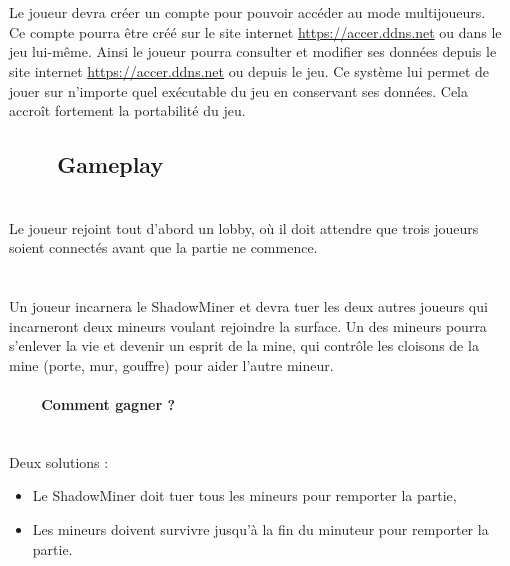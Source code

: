 \documentclass[titlepage, 13px, a4paper]{report}
\begin{document}
\paragraph*{} \hspace{0pt} \\
Le joueur devra créer un compte pour pouvoir accéder au mode multijoueurs. \\
Ce compte pourra être créé sur le site internet \url{https://accer.ddns.net} ou dans le jeu lui-même. Ainsi le joueur pourra 
consulter et modifier ses données depuis le site internet \url{https://accer.ddns.net} ou depuis le jeu. Ce système lui permet 
de jouer sur n’importe quel exécutable du jeu en conservant ses données. 
Cela accroît fortement la portabilité du jeu. \\

\subsection[Gameplay]{~~~~Gameplay}
\paragraph*{} \hspace{0pt} \\
Le joueur rejoint tout d’abord un lobby, où il doit attendre que trois joueurs 
soient connectés avant que la partie ne commence.

\paragraph*{} \hspace{0pt} \\
Un joueur incarnera le ShadowMiner et devra tuer les deux autres joueurs qui 
incarneront deux mineurs voulant rejoindre la surface. Un des mineurs pourra 
s’enlever la vie et devenir un esprit de la mine, qui contrôle les cloisons de 
la mine (porte, mur, gouffre) pour aider l’autre mineur. \\

\paragraph*{~~~~Comment gagner ?} \hspace{0pt} \\
Deux solutions : \\
{\begin{itemize}
	\item Le ShadowMiner doit tuer tous les mineurs pour remporter la partie,
	\item Les mineurs doivent survivre jusqu’à la fin du minuteur pour remporter la partie. \\
\end{itemize}}
\end{document}
